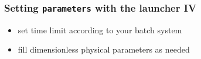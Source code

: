 \documentclass[10pt]{beamer}
\begin{document}
{
\begin{frame}[fragile]
  \frametitle{Setting {\tt parameters} with the launcher IV}

\vspace{5.25cm}

\begin{block}{}
\begin{itemize}
\item set time limit according to your batch system
\item fill dimensionless physical parameters as needed
\end{itemize}
\end{block}

\end{frame}
}

\end{document}
